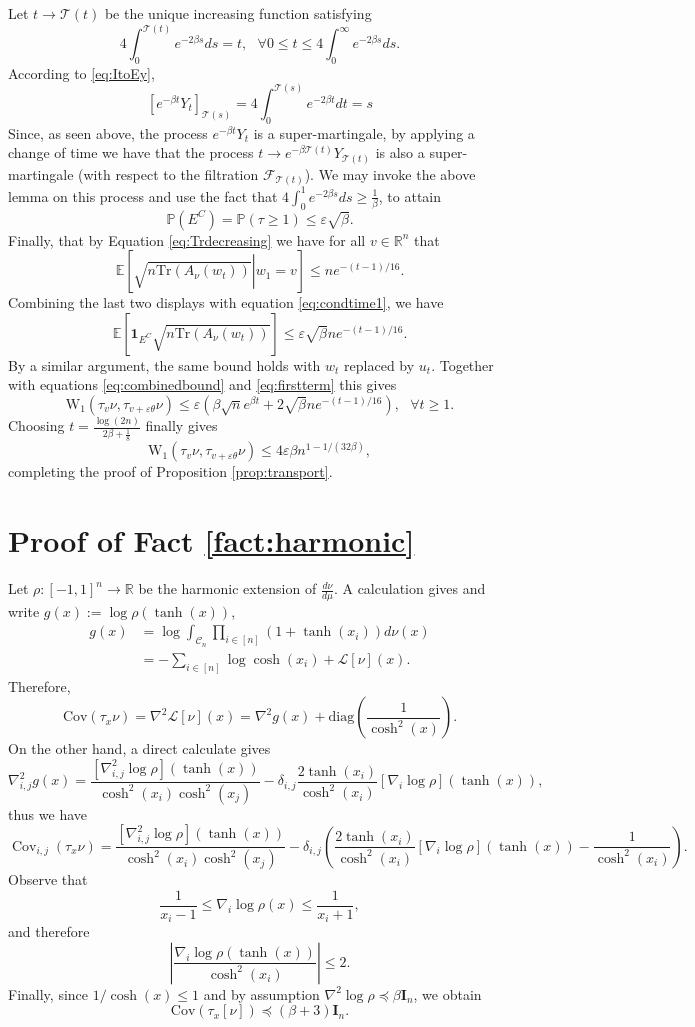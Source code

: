 \documentclass[12pt]{article}
\def \RR {\mathbb R}
\def \EE {\mathbb E}
\def \PP {\mathbb P}
\def \eps {\varepsilon}
\def \DC {\mathcal{C}_n}
\def \Id {\mathbf{I}_n}
\def \COV {\mathrm{Cov}}
\def \TTT {\mathcal{T}}
\def \FF {\mathcal{F}}
\theoremstyle{definition}
\theoremstyle{remark}
\begin{document}
Let $t \to \TTT(t)$ be the unique increasing function satisfying
$$
4 \int_0^{\TTT(t)} e^{-2 \beta s} ds = t, ~~~ \forall 0 \leq t \leq 4 \int_0^{\infty} e^{-2 \beta s} ds.
$$
According to \eqref{eq:ItoEy}, 
$$
[e^{-\beta t} Y_t]_{\TTT(s)} = 4 \int_0^{\TTT(s)} e^{-2 \beta t} dt = s
$$
Since, as seen above, the process $e^{-\beta t} Y_t$ is a super-martingale, by applying a change of time we have that the process $t \to e^{-\beta \TTT(t)} Y_{\TTT(t)}$ is also a super-martingale (with respect to the filtration $\FF_{\TTT(t)}$). We may invoke the above lemma on this process and use the fact that $4 \int_0^1 e^{-2 \beta s} ds \geq \frac{1}{\beta}$, to attain
$$
\PP \left ( E^C \right ) = \PP(\tau \geq 1) \leq \eps \sqrt{\beta}.
$$
Finally, that by Equation \eqref{eq:Trdecreasing} we have for all $v \in \RR^n$ that
$$
\EE \left . \left [ \sqrt{n\mathrm{Tr}(A_\nu(w_t))} \right | w_1 = v \right ] \leq n e^{-(t-1)/16}.
$$
Combining the last two displays with equation \eqref{eq:condtime1}, we have
$$
\EE \left [ \mathbf{1}_{E^C} \sqrt{n\mathrm{Tr}(A_\nu(w_t))} \right ] \leq \eps \sqrt{\beta} n e^{-(t-1)/16}.
$$
By a similar argument, the same bound holds with $w_t$ replaced by $u_t$. Together with equations \eqref{eq:combinedbound} and \eqref{eq:firstterm} this gives
$$
\mathrm{W}_1(\tau_v \nu, \tau_{v + \eps \theta} \nu) \leq \eps \left (\beta \sqrt{n} e^{\beta t} + 2 \sqrt{\beta} n e^{-(t-1)/16} \right ), ~~~ \forall t \geq 1.
$$
Choosing $t = \frac{\log(2n)}{2 \beta + \frac{1}{8}}$ finally gives
$$
\mathrm{W}_1(\tau_v \nu, \tau_{v + \eps \theta} \nu) \leq 4 \eps \beta n^{1-1/(32 \beta)},
$$
completing the proof of Proposition \ref{prop:transport}.
\section{Proof of Fact \ref{fact:harmonic}} \label{sec:harmonic}
Let $\rho:[-1,1]^n \to \RR$ be the harmonic extension of $\frac{d \nu}{d \mu}$. A calculation gives
and write $g(x):=\log \rho (\tanh(x))$, 
\begin{align*}
g(x) & = \log \int_{\DC} \prod_{i \in [n]} \left (1 + \tanh(x_i) \right ) d \nu(x) \\
& = - \sum_{i \in [n]} \log \cosh(x_i) + \mathcal{L}[\nu](x).
\end{align*}
Therefore,
$$\COV(\tau_x\nu)=\nabla^2\mathcal{L}[\nu](x) = \nabla^2g(x)+\mathrm{diag}\left(\frac{1}{\cosh^2(x)}\right).$$
On the other hand, a direct calculate gives
$$\nabla^2_{i,j}g(x)=\frac{[\nabla^2_{i,j}\log \rho](\tanh(x))}{\cosh^2(x_i)\cosh^2(x_j)}-
\delta_{i,j}\frac{2\tanh(x_i)}{\cosh^2(x_i)}[\nabla_i\log \rho](\tanh(x)),$$
thus we have
$$\operatorname{Cov}_{i,j}(\tau_{x}\nu)=
\frac{[\nabla^2_{i,j}\log \rho](\tanh(x))}{\cosh^2(x_i)\cosh^2(x_j)}
-\delta_{i,j}\left(\frac{2\tanh(x_i)}{\cosh^2(x_i)}[\nabla_i\log \rho](\tanh(x))-\frac{1}{\cosh^2(x_i)}\right).$$
Observe that
$$\frac{1}{x_i-1}\le\nabla_i\log \rho(x)\le\frac{1}{x_i+1},$$
and therefore
$$\left\vert\frac{\nabla_i\log \rho(\tanh(x))}{\cosh^2(x_i)}\right\vert\le 2.$$
Finally, since $1/\cosh(x)\le 1$ and by assumption $\nabla^2\log \rho \preceq\beta\Id$, we obtain
$$\COV (\tau_{x}[\nu])\preceq(\beta+3)\Id.$$
\end{document}
